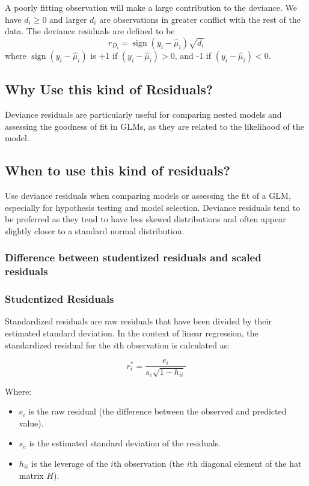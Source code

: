 \documentclass{article}
\begin{document}
A poorly fitting observation will make a large contribution to the deviance. We have $d_i \geq 0$ and larger $d_i$ are observations in greater conflict with the rest of the data. The deviance residuals are defined to be
$$
r_{D_i}=\operatorname{sign}\left(y_i-\widehat{\mu}_i\right) \sqrt{d_i}
$$
where $\operatorname{sign}\left(y_i-\widehat{\mu}_i\right)$ is +1 if $\left(y_i-\widehat{\mu}_i\right)>0$, and -1 if $\left(y_i-\widehat{\mu}_i\right)<0$.
\subsection{Why Use this kind of Residuals?}
Deviance residuals are particularly useful for comparing nested models and assessing the goodness of fit in GLMs, as they are related to the likelihood of the model.

\subsection{When to use this kind of residuals?}
Use deviance residuals when comparing models or assessing the fit of a GLM, especially for hypothesis testing and model selection.
Deviance residuals tend to be preferred as they tend to have less skewed distributions and often appear slightly closer to a standard normal distribution.


\subsubsection{Difference between studentized residuals and scaled residuals}
\subsubsection{Studentized Residuals}
Standardized residuals are raw residuals that have been divided by their estimated standard deviation. In the context of linear regression, the standardized residual for the \(i\)th observation is calculated as:

\[ r_i^* = \frac{e_i}{s_e\sqrt{1 - h_{ii}}} \]

Where:
\begin{itemize}
    \item \( e_i \) is the raw residual (the difference between the observed and predicted value).
    \item \( s_e \) is the estimated standard deviation of the residuals.
    \item \( h_{ii} \) is the leverage of the \(i\)th observation (the \(i\)th diagonal element of the hat matrix \(H\)).
\end{itemize}
\end{document}
